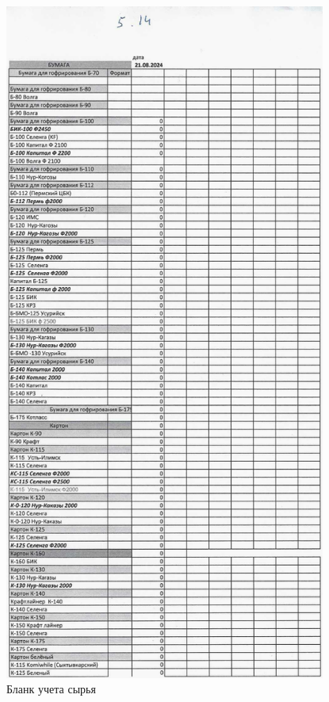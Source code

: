 \begin{figure}
\begin{center}
  \includegraphics[height=0.94\textheight, width=0.94\textwidth, keepaspectratio]{Pics 1/5.14 файл бригадира по сырью_0001.jpg }
\end{center}
  \caption{Бланк учета сырья}
  \label{pic:5.14 файл бригадира по сырью_0001}
\end{figure}


